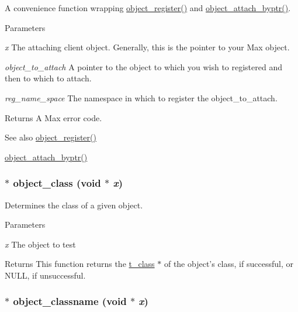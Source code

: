 A convenience function wrapping \hyperlink{group__obj_gaaa97beba179d6aebd3f3ede1b5c781fa}{object\_\-register()} and \hyperlink{group__obj_ga76657298bcd43ae4f9098e3ed2b97c72}{object\_\-attach\_\-byptr()}. 
\begin{DoxyParams}{Parameters}
\item[{\em x}]The attaching client object. Generally, this is the pointer to your Max object. \item[{\em object\_\-to\_\-attach}]A pointer to the object to which you wish to registered and then to which to attach. \item[{\em reg\_\-name\_\-space}]The namespace in which to register the object\_\-to\_\-attach. \end{DoxyParams}
\begin{DoxyReturn}{Returns}
A Max error code.
\end{DoxyReturn}
\begin{DoxySeeAlso}{See also}
\hyperlink{group__obj_gaaa97beba179d6aebd3f3ede1b5c781fa}{object\_\-register()} 

\hyperlink{group__obj_ga76657298bcd43ae4f9098e3ed2b97c72}{object\_\-attach\_\-byptr()} 
\end{DoxySeeAlso}
\hypertarget{group__obj_ga035c5ca1d7d25921533b59451d730c44}{
\subsubsection[{object\_\-class}]{$\ast$ object\_\-class (void $\ast$ {\em x})}}
\label{group__obj_ga035c5ca1d7d25921533b59451d730c44}


Determines the class of a given object. 
\begin{DoxyParams}{Parameters}
\item[{\em x}]The object to test \end{DoxyParams}
\begin{DoxyReturn}{Returns}
This function returns the \hyperlink{structt__class}{t\_\-class} $\ast$ of the object's class, if successful, or NULL, if unsuccessful. 
\end{DoxyReturn}
\hypertarget{group__obj_gac4523e68b4be4deb6db0ea91948d3553}{
\subsubsection[{object\_\-classname}]{$\ast$ object\_\-classname (void $\ast$ {\em x})}}
\label{group__obj_gac4523e68b4be4deb6db0ea91948d3553}


